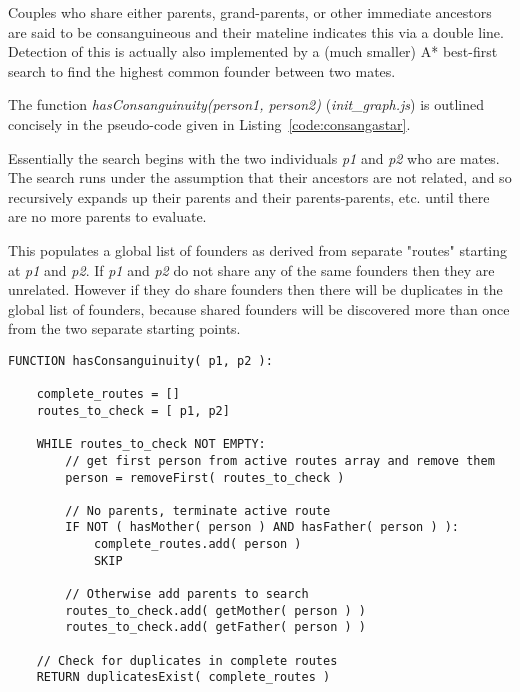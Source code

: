 Couples who share either parents, grand-parents, or other immediate ancestors are said to be consanguineous and their mateline indicates this via a double line.  Detection of this is actually also implemented by a (much smaller) A* best-first search to find the highest common founder between two mates.

The function \textit{hasConsanguinuity(person1, person2)} (\textit{init\_graph.js}) is outlined concisely in the pseudo-code given in Listing~\ref{code:consangastar}.

Essentially the search begins with the two individuals \textit{p1} and \textit{p2} who are mates. The search runs under the assumption that their ancestors are not related, and so recursively expands up their parents and their parents-parents, etc. until there are no more parents to evaluate.

This populates a global list of founders as derived from separate "routes" starting at \textit{p1} and \textit{p2}. If \textit{p1} and \textit{p2} do not share any of the same founders then they are unrelated. However if they do share founders then there will be duplicates in the global list of founders, because shared founders will be discovered more than once from the two separate starting points.

\begingroup
\begin{spacing}{0.9}
\begin{lstlisting}
FUNCTION hasConsanguinuity( p1, p2 ):

    complete_routes = []
    routes_to_check = [ p1, p2]
    
    WHILE routes_to_check NOT EMPTY:
        // get first person from active routes array and remove them
        person = removeFirst( routes_to_check )

        // No parents, terminate active route
        IF NOT ( hasMother( person ) AND hasFather( person ) ):
            complete_routes.add( person )
            SKIP

        // Otherwise add parents to search
        routes_to_check.add( getMother( person ) )
        routes_to_check.add( getFather( person ) )
        
    // Check for duplicates in complete routes
    RETURN duplicatesExist( complete_routes )
\end{lstlisting}
\vspace{-10pt}
\label{code:consangastar}
\end{spacing}
\endgroup


